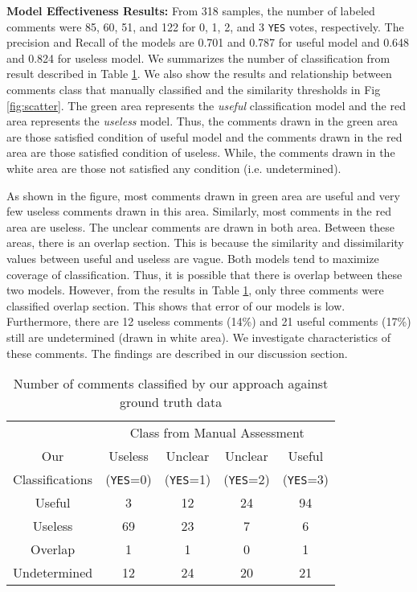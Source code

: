 \textbf{Model Effectiveness Results:} From 318 samples, the number of labeled comments were 85, 60, 51, and 122 for 0, 1, 2, and 3 \texttt{YES} votes, respectively. The precision and Recall of the models are 0.701 and 0.787 for useful model and 0.648 and 0.824 for useless model. We summarizes the number of classification from result described in Table \ref{tb:classify_number}.  We also show the results and relationship between comments class that manually classified and the similarity thresholds in Fig  \ref{fig:scatter}. The green area represents the \emph{useful} classification model and the red area represents the \emph{useless} model. Thus, the comments drawn in the green area are those satisfied condition of useful model and the comments drawn in the red area are those satisfied condition of useless. While, the comments drawn in the white area are those not satisfied any condition (i.e. undetermined). 


As shown in the figure, most comments drawn in green area are useful and very few useless comments drawn in this area. Similarly, most comments in the red area are useless. The unclear comments are drawn in both area. Between these areas, there is an overlap section. This is because the similarity and dissimilarity values between useful and useless are vague. Both models tend to maximize coverage of classification. Thus, it is possible that there is overlap between these two models. However, from the results in Table \ref{tb:classify_number}, only three comments were classified overlap section. This shows that error of our models is low. Furthermore, there are 12 useless comments  (14\%) and  21 useful comments (17\%) still are undetermined (drawn in white area). We investigate characteristics of these comments. The findings are described in our discussion section.

\begin{table}[!t]
\centering
\small
\caption{Number of comments classified by our approach against ground truth data}
\begin{tabular}{ccccc}
\hline
& \multicolumn{4}{c}{Class from Manual Assessment} \\ \cline{2-5}
Our&  Useless  & Unclear  & Unclear & Useful \\
Classifications&  (\texttt{YES}=0) & (\texttt{YES}=1) & (\texttt{YES}=2) & (\texttt{YES}=3) \\
\hline \hline
Useful & 3 & 12 & 24 & 94 \\
Useless & 69 & 23 & 7 & 6 \\
Overlap & 1 & 1 & 0 & 1 \\
Undetermined & 12 & 24 & 20 & 21 \\
\hline
\end{tabular}
\label{tb:classify_number}
\end{table}

